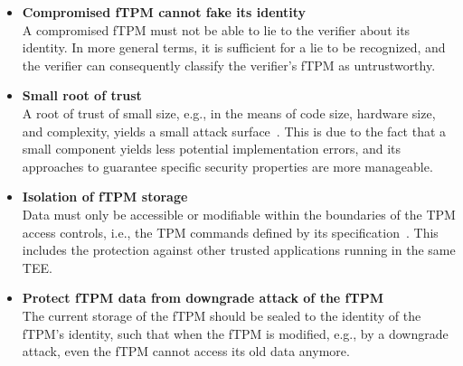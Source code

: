 \begin{itemize}

  \item{\textbf{Compromised fTPM cannot fake its identity}\\
  A compromised fTPM must not be able to lie to the verifier about its identity.
  In more general terms, it is sufficient for a lie to be recognized, and the verifier can consequently classify the verifier's fTPM as untrustworthy.}

  \item{\textbf{Small root of trust}\\
  A root of trust of small size, e.g., in the means of code size, hardware size, and complexity, yields a small attack surface~\cite{Singaravelu2006}.
  This is due to the fact that a small component yields less potential implementation errors, and its approaches to guarantee specific security properties are more manageable.}
  
  \item{\textbf{Isolation of fTPM storage}\\
  Data must only be accessible or modifiable within the boundaries of the TPM access controls, i.e., the TPM commands defined by its specification~\cite{tpm}.}
  This includes the protection against other trusted applications running in the same TEE\@.
  
  \item{\textbf{Protect fTPM data from downgrade attack of the fTPM}\\
  The current storage of the fTPM should be sealed to the identity of the fTPM's identity, such that when the fTPM is modified, e.g., by a downgrade attack, even the fTPM cannot access its old data anymore.}


\end{itemize}
